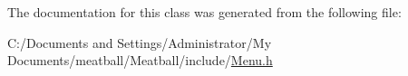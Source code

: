 The documentation for this class was generated from the following file\-:\begin{DoxyCompactItemize}
\item 
C\-:/\-Documents and Settings/\-Administrator/\-My Documents/meatball/\-Meatball/include/\hyperlink{_menu_8h}{Menu.\-h}\end{DoxyCompactItemize}
